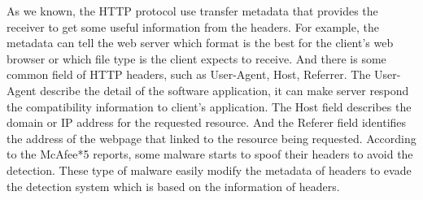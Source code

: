 As we known, the HTTP protocol use transfer metadata that provides the receiver to get some useful information from the headers. For example, the metadata can tell the web server which format is the best for the client's web browser or which file type is the client expects to receive.  And there is some common field of HTTP headers, such as User-Agent, Host, Referrer. The User-Agent describe the detail of the software application, it can make server respond the compatibility information to client's application. The Host field describes the domain or IP address for the requested resource. And the Referer field identifies the address of the webpage that linked to the resource being requested. According to the McAfee*5 reports, some malware starts to spoof their headers to avoid the detection.  These type of malware easily modify the metadata of headers to evade the detection system which is based on the information of headers. 
